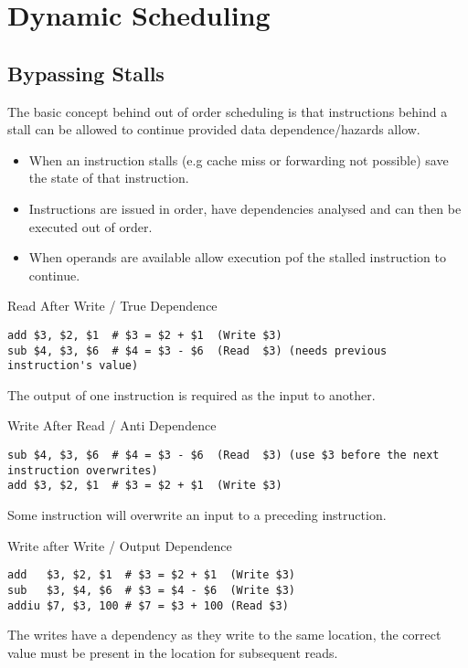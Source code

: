 \chapter{Dynamic Scheduling}
\section{Bypassing Stalls}
The basic concept behind out of order scheduling is that instructions behind a stall can be allowed to continue provided data dependence/hazards allow.
\begin{itemize}
    \item When an instruction stalls (e.g cache miss or forwarding not possible) save the state of that instruction.
    \item Instructions are issued in order, have dependencies analysed and can then be executed out of order.
    \item When operands are available allow execution pof the stalled instruction to continue.
\end{itemize}
\begin{definitionbox}{Read After Write / True Dependence}
    \begin{verbatim}
add $3, $2, $1  # $3 = $2 + $1  (Write $3)
sub $4, $3, $6  # $4 = $3 - $6  (Read  $3) (needs previous instruction's value)
    \end{verbatim}
    The output of one instruction is required as the input to another.
\end{definitionbox}

\begin{definitionbox}{Write After Read / Anti Dependence}
    \begin{verbatim}
sub $4, $3, $6  # $4 = $3 - $6  (Read  $3) (use $3 before the next instruction overwrites)
add $3, $2, $1  # $3 = $2 + $1  (Write $3)
    \end{verbatim}
    Some instruction will overwrite an input to a preceding instruction.
\end{definitionbox}

\begin{definitionbox}{Write after Write / Output Dependence}
    \begin{verbatim}
add   $3, $2, $1  # $3 = $2 + $1  (Write $3)
sub   $3, $4, $6  # $3 = $4 - $6  (Write $3)
addiu $7, $3, 100 # $7 = $3 + 100 (Read $3)
    \end{verbatim}
    The writes have a dependency as they write to the same location, the correct value must be present in the location for subsequent reads.
\end{definitionbox}

